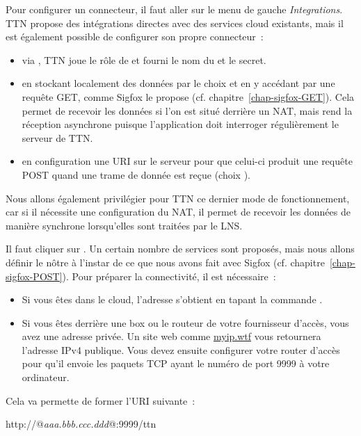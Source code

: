 Pour configurer un connecteur, il faut aller sur le menu de gauche \textit{Integrations}. TTN propose des intégrations directes avec des services cloud existants, mais il est également possible de configurer son propre connecteur~:
\begin{itemize}
    \item via , TTN joue le rôle de  et fourni le nom du  et le secret.
    \item en stockant localement des données par le choix \textit{} et en y accédant par une requête GET, comme Sigfox le propose (cf. chapitre~\vref{chap-sigfox-GET}). Cela permet de recevoir les données si l'on est situé derrière un \ac{NAT}, mais rend la réception asynchrone puisque l'application doit interroger régulièrement le serveur de TTN.
    \item en configuration une URI sur le serveur pour que celui-ci produit une requête POST quand une trame de donnée est reçue (choix \textit{}).
\end{itemize}

         \vspace{1em}

Nous allons également privilégier pour TTN ce dernier mode de fonctionnement, car si il nécessite une configuration du \ac{NAT}, il permet de recevoir les données de manière synchrone lorsqu'elles sont traitées par le LNS.


Il faut cliquer sur . Un certain nombre de services sont proposés, mais nous allons définir le nôtre à l'instar de ce que nous avons fait avec Sigfox (cf. chapitre~\vref{chap-sigfox-POST}). Pour préparer la connectivité, il est nécessaire~:
\begin{itemize}
    \item Si vous êtes dans le cloud, l'adresse s'obtient en tapant la commande \texttt{}.
    \item Si vous êtes derrière une box ou le routeur de votre fournisseur d'accès, vous avez une adresse privée. Un site web comme \url{myip.wtf} vous retournera l'adresse IPv4 publique. Vous devez ensuite configurer votre router d'accès pour qu'il envoie les paquets TCP ayant le numéro de port 9999 à votre ordinateur.
\end{itemize}

         \vspace{1em}


Cela va permette de former l'URI suivante~:
\begin{termc}[backgroundcolor=\color{blue!10}, basicstyle=\ttfamily\small, escapechar=@]
http://@\textit{aaa.bbb.ccc.ddd}@:9999/ttn
\end{termc}

